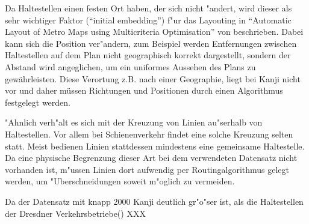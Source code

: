 Da Haltestellen einen festen Ort haben, der sich nicht "andert, wird dieser als sehr wichtiger Faktor ("`initial embedding"') f"ur das Layouting in "`Automatic Layout of Metro Maps using Multicriteria Optimisation"' von \cite{automaticlayoutmetro08} beschrieben. Dabei kann sich die Position ver"andern, zum Beispiel werden Entfernungen zwischen Haltestellen auf dem Plan nicht geographisch korrekt dargestellt, sondern der Abstand wird angeglichen, um ein uniformes Aussehen des Plans zu gewährleisten. Diese Verortung z.B. nach einer Geographie, liegt bei Kanji nicht vor und daher müssen Richtungen und Positionen durch einen Algorithmus festgelegt werden.

"Ahnlich verh"alt es sich mit der Kreuzung von Linien au"serhalb von Haltestellen. Vor allem bei Schienenverkehr findet eine solche Kreuzung selten statt. Meist bedienen Linien stattdessen mindestens eine gemeinsame Haltestelle. Da eine physische Begrenzung dieser Art bei dem verwendeten Datensatz nicht vorhanden ist, m"ussen Linien dort aufwendig per Routingalgorithmus gelegt werden, um "Uberschneidungen soweit m"oglich zu vermeiden.

Da der Datensatz mit knapp 2000 Kanji deutlich gr"o"ser ist, als die Haltestellen der Dresdner Verkehrsbetriebe(\cite{dvbag}) XXX
